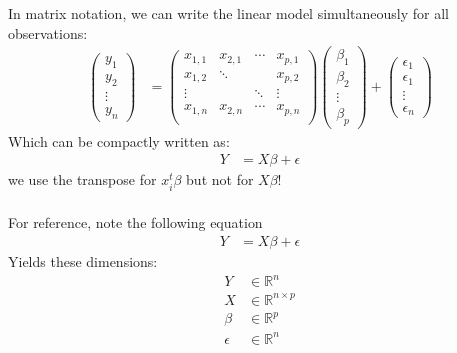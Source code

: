 \begin{frame}[fragile] \frametitle{}

In matrix notation, we can write the linear model simultaneously
for all observations:
\begin{align*}
\left(\begin{array}{c}y_1\\ y_2\\ \vdots\\ y_n\end{array}\right) &=
  \left(\begin{array}{cccc}x_{1,1}&x_{2,1}&\cdots&x_{p,1}\\
                           x_{1,2}&\ddots&&x_{p,2}\\
                           \vdots&&\ddots&\vdots\\
                           x_{1,n}&x_{2,n}&\cdots&x_{p,n}\\\end{array}\right)
  \left(\begin{array}{c}\beta_1\\ \beta_2\\ \vdots\\ \beta_p\end{array}\right) +
  \left(\begin{array}{c}\epsilon_1\\ \epsilon_1\\ \vdots\\ \epsilon_n\end{array}\right)
\end{align*}
\pause Which can be compactly written as:
\begin{align*}
Y &= X \beta + \epsilon
\end{align*}
 we use the transpose for $x_i^t \beta$ but not for $X \beta$!

\end{frame}

\begin{frame}[fragile] \frametitle{}

For reference, note the following equation
\begin{align*}
Y &= X \beta + \epsilon
\end{align*}
Yields these dimensions:
\begin{align*}
Y &\in \mathbb{R}^n \\
X &\in \mathbb{R}^{n \times p} \\
\beta &\in \mathbb{R}^p \\
\epsilon &\in \mathbb{R}^n \\
\end{align*}

\end{frame}

